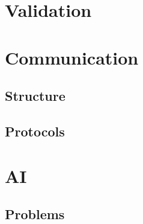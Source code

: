 \documentclass[11pt]{extarticle}
\begin{document}
\section{Validation}

\section{Communication}
\subsection{Structure}
\subsection{Protocols}

\section{AI}
\subsection{Problems}



\end{document}
